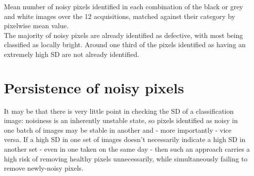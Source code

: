 \documentclass[10pt,fleqn]{article}
\begin{document}
\begin{table}[!ht] %
\begin{footnotesize}
\caption{Mean number of noisy pixels identified in each combination of the black or grey and white images over the 12 acquisitions, matched against their category by pixelwise mean value.\\ The majority of noisy pixels are already identified as defective, with most being classified as locally bright. Around one third of the pixels identified as having an extremely high SD are not already identified.}

\end{footnotesize}
\end{table}


\section{Persistence of noisy pixels}

It may be that there is very little point in checking the SD of a classification image: noisiness is an inherently unstable state, so pixels identified as noisy in one batch of images may be stable in another and - more importantly - vice versa. If a high SD in one set of images doesn't necessarily indicate a high SD in another set - even in one taken on the same day - then such an approach carries a high risk of removing healthy pixels unnecessarily, while simultaneously failing to remove newly-noisy pixels.

\end{document}
